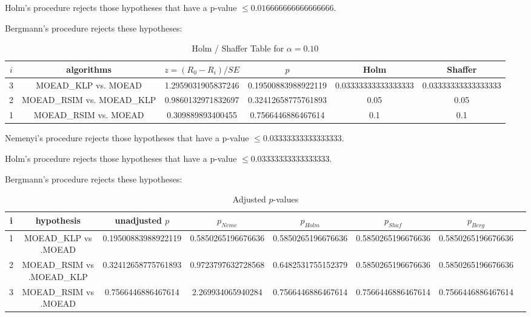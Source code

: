 \documentclass[a4paper,10pt]{article}
\begin{document}
\begin{landscape}
Holm's procedure rejects those hypotheses that have a p-value $\le0.016666666666666666$.


Bergmann's procedure rejects these hypotheses:


\begin{itemize}


\end{itemize}


\begin{table}[!htp]
\centering\tiny
\caption{Holm / Shaffer Table for $\alpha=0.10$}
\begin{tabular}{cccccc}
$i$&algorithms&$z=(R_0 - R_i)/SE$&$p$&Holm&Shaffer\\
\hline
3&MOEAD_KLP vs. MOEAD&1.2959031905837246&0.19500883988922119&0.03333333333333333&0.03333333333333333\\
2&MOEAD_RSIM vs. MOEAD_KLP&0.9860132971832697&0.32412658775761893&0.05&0.05\\
1&MOEAD_RSIM vs. MOEAD&0.309889893400455&0.7566446886467614&0.1&0.1\\
\hline
\end{tabular}
\end{table}
Nemenyi's procedure rejects those hypotheses that have a p-value $\le0.03333333333333333$.


Holm's procedure rejects those hypotheses that have a p-value $\le0.03333333333333333$.


Bergmann's procedure rejects these hypotheses:


\begin{itemize}


\end{itemize}


\begin{table}[!htp]
\centering\tiny
\caption{Adjusted $p$-values}
\begin{tabular}{cccccccc}
i&hypothesis&unadjusted $p$&$p_{Neme}$&$p_{Holm}$&$p_{Shaf}$&$p_{Berg}$\\
\hline
1&MOEAD_KLP vs .MOEAD&0.19500883988922119&0.5850265196676636&0.5850265196676636&0.5850265196676636&0.5850265196676636\\
2&MOEAD_RSIM vs .MOEAD_KLP&0.32412658775761893&0.9723797632728568&0.6482531755152379&0.5850265196676636&0.5850265196676636\\
3&MOEAD_RSIM vs .MOEAD&0.7566446886467614&2.269934065940284&0.7566446886467614&0.7566446886467614&0.7566446886467614\\
\hline
\end{tabular}
\end{table}

\end{landscape}
\end{document}
